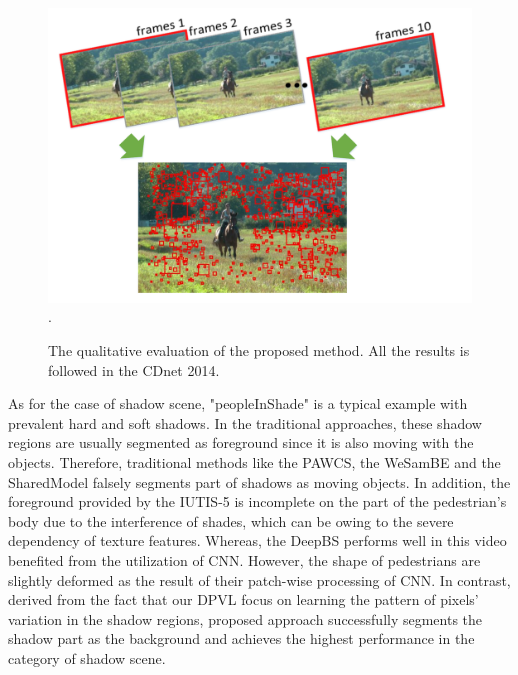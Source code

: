 \documentclass[journal]{IEEEtran}
\begin{document}
\begin{figure}[!t]	\centering
    \includegraphics[width=\textwidth]{figure/fig3}
\DeclareGraphicsExtensions.
    \caption{The qualitative evaluation of the proposed method. All the results is followed in the CDnet 2014.}
    \label{results_chart}
\end{figure}

As for the case of shadow scene, "peopleInShade" is a typical example with prevalent hard and soft shadows. 
In the traditional approaches, these shadow regions are usually segmented as foreground since it is also moving with the objects. 
Therefore, traditional methods like the PAWCS, the WeSamBE and the SharedModel falsely segments part of shadows as moving objects. 
In addition, the foreground provided by the IUTIS-5 is incomplete on the part of the pedestrian's body due to the interference of shades, which can be owing to the severe dependency of texture features. 
Whereas, the DeepBS performs well in this video benefited from the utilization of CNN. 
However, the shape of pedestrians are slightly deformed as the result of their patch-wise processing of CNN. 
In contrast, derived from the fact that our DPVL focus on learning the pattern of pixels' variation in the shadow regions, proposed approach successfully segments the shadow part as the background and achieves the highest performance in the category of shadow scene.
\end{document}
